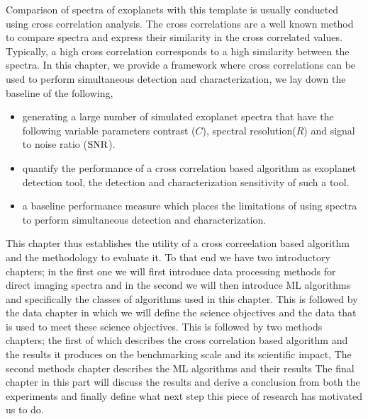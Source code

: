 Comparison of spectra of exoplanets with this template is usually conducted using cross correlation analysis. The cross correlations are a well known method \@
to compare spectra and express their similarity in the cross correlated values. 
Typically, a high cross correlation corresponds to a high similarity between the spectra.
In this chapter, we provide a framework where cross correlations can be used to perform simultaneous detection and characterization, we lay down the baseline\@
of the following,
\begin{itemize}
    \item generating a large number of simulated exoplanet spectra that have the following variable parameters contrast ($C$), spectral resolution($R$) \@
    and signal to noise ratio ($\rm{SNR}$).
    \item quantify the performance of a cross correlation based algorithm as exoplanet detection tool, the detection and characterization sensitivity\@
    of such a tool.
    \item a baseline performance measure which places the limitations of using spectra to perform simultaneous detection and characterization.
\end{itemize}
This chapter thus establishes the utility of a cross correelation based algorithm and the methodology to evaluate\@
it.
To that end we have two introductory chapters;
in the first one  we will first introduce data processing methods for direct imaging spectra and in the second we will then introduce ML algorithms and specifically the classes of algorithms used in this chapter.
This is followed by the data chapter in which we will define the science objectives and the data that is used to meet these science objectives.
This is followed by two methods chapters; 
the first of which describes the cross correlation based algorithm and the results it produces on the benchmarking scale and its scientific impact,
The second methods chapter describes the ML algorithms and their results
The final chapter in this part will discuss the results and derive a conclusion from both the experiments and finally define what next step this piece of research has motivated us to do.
